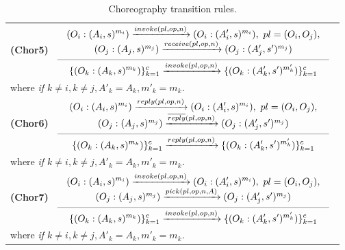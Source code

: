 \begin{table}[!ht]
{{\begin{tabular}{l}

\\[0.7cm]

\hspace{0.6cm}\textbf{(Chor5)}
$\reglaa{ %
(O_i:(A_i,s)^{m_i}) \xrightarrow{invoke(pl,op,n)} (O_i:(A'_i,s)^{m_i}),\ pl=(O_i,O_j),\\
(O_j:(A_j,s)^{m_j}) \xrightarrow{receive(pl,op,n)} (O_j:(A'_j,s')^{m_j})
}
{ %
\{(O_k:(A_k,s)^{m_k})\}_{k=1}^c
\xrightarrow{invoke(pl,op,n)}
\{(O_k:(A'_k,s')^{m'_k})\}_{k=1}^c
}{10}$
\\[0.7cm]
\hspace{2.cm}where  \it{if} $k\neq i,k\neq j, A'_k=A_k,m'_k=m_k$.

\\[0.2cm]

\hspace{0.6cm}\textbf{(Chor6)}
$\reglaa{ %
(O_i:(A_i,s)^{m_i}) \xrightarrow{reply(pl,op,n)} (O_i:(A'_i,s)^{m_i}),\ pl=(O_i,O_j),\\
(O_j:(A_j,s)^{m_j}) \xrightarrow{\overline{reply}(pl,op,n)} (O_j:(A'_j,s')^{m_j})
}
{ %
\{(O_k:(A_k,s)^{m_k})\}_{k=1}^c
\xrightarrow{reply(pl,op,n)}
\{(O_k:(A'_k,s')^{m'_k})\}_{k=1}^c
}{10}$\\[0.7cm]
\hspace{2.cm}where  \it{if} $k\neq i,k\neq j, A'_k=A_k,m'_k=m_k$.

\\[0.2cm]

\hspace{0.6cm}\textbf{(Chor7)}
$\reglaa{ %
(O_i:(A_i,s)^{m_i}) \xrightarrow{invoke(pl,op,n)} (O_i:(A'_i,s)^{m_i}),\ pl=(O_i,O_j),\\
(O_j:(A_j,s)^{m_j}) \xrightarrow{pick(pl,op,n,A)} (O_j:(A'_j,s')^{m_j})
}
{ %
\{(O_k:(A_k,s)^{m_k})\}_{k=1}^c
\xrightarrow{invoke(pl,op,n)}
\{(O_k:(A'_k,s')^{m'_k})\}_{k=1}^c
}{10}$\\[0.7cm]
\hspace{2.cm}where  \it{if} $k\neq i,k\neq j, A'_k=A_k,m'_k=m_k$.
\\[0.4cm]

\end{tabular}
}}
\caption{\label{tab:coreo}Choreography transition rules.}
\vspace{-0.7cm}
\end{table}
\newpage
